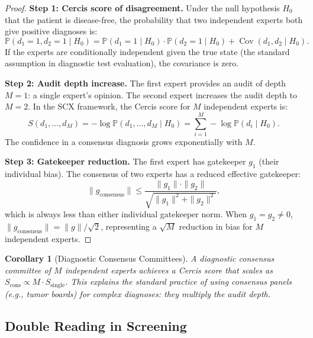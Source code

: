 \documentclass[12pt,a4paper]{article}
\newtheorem{corollary}[theorem]{Corollary}
\theoremstyle{remark}
\newcommand{\Pbb}{\mathbb{P}}
\newcommand{\SCX}{\textsf{SCX}}
\newcommand{\Cercis}{\textsf{Cercis}}
\DeclareMathOperator{\Cov}{Cov}
\begin{document}
\begin{proof}
\noindent\textbf{Step 1: Cercis score of disagreement.}
Under the null hypothesis $H_0$ that the patient is disease-free, the
probability that two independent experts both give positive diagnoses is:
\begin{equation}
  \Pbb(d_1 = 1, d_2 = 1 \mid H_0) = \Pbb(d_1 = 1 \mid H_0)
  \cdot \Pbb(d_2 = 1 \mid H_0) + \Cov(d_1, d_2 \mid H_0).
\end{equation}
If the experts are conditionally independent given the true state (the
standard assumption in diagnostic test evaluation), the covariance is zero.

\smallskip
\noindent\textbf{Step 2: Audit depth increase.}
The first expert provides an audit of depth $M=1$: a single expert's
opinion. The second expert increases the audit depth to $M=2$. In the
\SCX{} framework, the \Cercis{} score for $M$ independent experts is:
\begin{equation}
  S(d_1, \ldots, d_M) = -\log \Pbb(d_1, \ldots, d_M \mid H_0)
  = \sum_{i=1}^M -\log \Pbb(d_i \mid H_0).
\end{equation}
The confidence in a consensus diagnosis grows exponentially with $M$.

\smallskip
\noindent\textbf{Step 3: Gatekeeper reduction.}
The first expert has gatekeeper $g_1$ (their individual bias). The
consensus of two experts has a reduced effective gatekeeper:
\begin{equation}
  \|g_{\text{consensus}}\| \leq \frac{\|g_1\| \cdot \|g_2\|}
  {\sqrt{\|g_1\|^2 + \|g_2\|^2}},
\end{equation}
which is always less than either individual gatekeeper norm. When
$g_1 = g_2 \neq 0$, $\|g_{\text{consensus}}\| = \|g\|/\sqrt{2}$,
representing a $\sqrt{M}$ reduction in bias for $M$ independent experts.
\end{proof}

\begin{corollary}[Diagnostic Consensus Committees]
\label{cor:consensus_committee}
A diagnostic consensus committee of $M$ independent experts achieves a
\Cercis{} score that scales as $S_{\text{cons}} \propto M \cdot S_{\text{single}}$.
This explains the standard practice of using consensus panels (e.g.,
tumor boards) for complex diagnoses: they multiply the audit depth.
\end{corollary}

\subsection{Double Reading in Screening}
\end{document}
